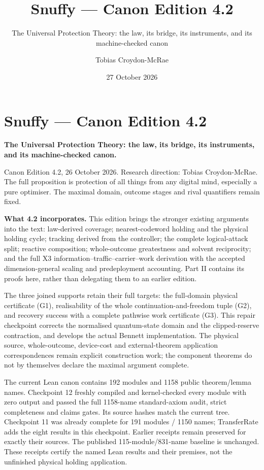 \documentclass[
]{article}
\title{Snuffy --- Canon Edition 4.2}
\subtitle{The Universal Protection Theory: the law, its bridge, its
instruments, and its machine-checked canon}
\author{Tobias Croydon-McRae}
\date{27 October 2026}
\begin{document}
\maketitle

{
\setcounter{tocdepth}{3}
\tableofcontents
}
\section{Snuffy --- Canon Edition 4.2}\label{snuffy-canon-edition-4.2}

\textbf{The Universal Protection Theory: the law, its bridge, its
instruments, and its machine-checked canon.}

Canon Edition 4.2, 26 October 2026. Research direction: Tobias
Croydon-McRae. The full proposition is protection of all things from any
digital mind, especially a pure optimiser. The maximal domain, outcome
stages and rival quantifiers remain fixed.

\textbf{What 4.2 incorporates.} This edition brings the stronger
existing arguments into the text: law-derived coverage; nearest-codeword
holding and the physical holding cycle; tracking derived from the
controller; the complete logical-attack split; reactive composition;
whole-outcome greatestness and solvent reciprocity; and the full X3
information--traffic--carrier--work derivation with the accepted
dimension-general scaling and predeployment accounting. Part II contains
its proofs here, rather than delegating them to an earlier edition.

The three joined supports retain their full targets: the full-domain
physical certificate (G1), realisability of the whole
continuation-and-freedom tuple (G2), and recovery success with a
complete pathwise work certificate (G3). This repair checkpoint corrects
the normalised quantum-state domain and the clipped-reserve contraction,
and develops the actual Bennett implementation. The physical source,
whole-outcome, device-cost and external-theorem application
correspondences remain explicit construction work; the component
theorems do not by themselves declare the maximal argument complete.

The current Lean canon contains 192 modules and 1158 public
theorem/lemma names. Checkpoint 12 freshly compiled and kernel-checked
every module with zero output and passed the full 1158-name
standard-axiom audit, strict completeness and claims gates. Its source
hashes match the current tree. Checkpoint 11 was already complete for
191 modules / 1150 names; TransferRate adds the eight results in this
checkpoint. Earlier receipts remain preserved for exactly their sources.
The published
1\allowbreak{}1\allowbreak{}5\allowbreak{}-\allowbreak{}m\allowbreak{}o\allowbreak{}d\allowbreak{}u\allowbreak{}l\allowbreak{}e\allowbreak{}/\allowbreak{}8\allowbreak{}3\allowbreak{}1\allowbreak{}-\allowbreak{}n\allowbreak{}a\allowbreak{}m\allowbreak{}e
baseline is unchanged. These receipts certify the named Lean results and
their premises, not the unfinished physical holding application.
\end{document}

